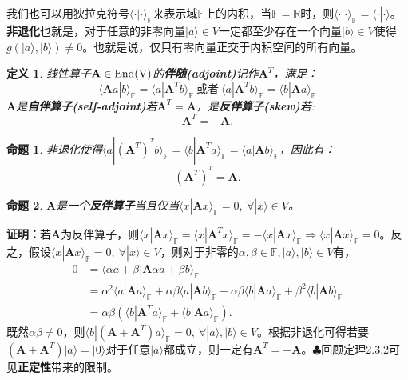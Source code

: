 \documentclass[mathserif,hyperref,UTF8,openany,b5paper]{ctexbook}
\newtheorem{defn}{定义}[section]
\newtheorem{pro}{命题}[section]
\begin{document}
我们也可以用狄拉克符号$\langle\cdot|\cdot\rangle_{\mathbb{F}}$来表示域$\mathbb{F}$上的内积，当$\mathbb{F}=\mathbb{R}$时，则$\langle\cdot|\cdot\rangle_{\mathbb{F}}=\langle\cdot|\cdot\rangle$。\textbf{非退化}也就是，对于任意的非零向量$|a\rangle\in V$一定都至少存在一个向量$|b\rangle\in V$使得$g(|a\rangle,|b\rangle)\neq 0$。也就是说，仅只有零向量正交于内积空间的所有向量。
\begin{defn}
线性算子$\mathbf{A}\in\rm End(V)$的\textbf{伴随(adjoint)}记作$\mathbf{A}^T$，满足：
\begin{equation}
    \langle\mathbf{A}a|b\rangle_\mathbb{F}=\langle a|\mathbf{A}^T b\rangle_\mathbb{F}\ \mbox{或者}\ \langle a|\mathbf{A}^T b\rangle_\mathbb{F} = \langle b|\mathbf{A} a\rangle_\mathbb{F}
\end{equation}
$\mathbf{A}$是\textbf{自伴算子(self-adjoint)}若$\mathbf{A}^T=\mathbf{A}$，是\textbf{反伴算子(skew)}若:
\begin{equation}
\boxed{\mathbf{A}^T=-\mathbf{A}}.
\end{equation}
\end{defn}
\begin{pro}
非退化使得$\langle a|(\mathbf{A}^T)^{^T} b\rangle_\mathbb{F} =\langle b|\mathbf{A}^T a\rangle_\mathbb{F} = \langle a|\mathbf{A} b\rangle_\mathbb{F}$，因此有：
\begin{equation}
\boxed{(\mathbf{A}^T)^{^T}=\mathbf{A}}.
\end{equation}
\end{pro}
\begin{pro}
$\mathbf{A}$是一个\textbf{反伴算子}当且仅当$\langle x|\mathbf{A} x\rangle_\mathbb{F}=0,\ \forall |x\rangle \in V$。
\end{pro}
\textbf{证明：}若$\mathbf{A}$为反伴算子，则$\langle x|\mathbf{A} x\rangle_\mathbb{F}=\langle x|\mathbf{A}^T x\rangle_\mathbb{F}=-\langle x|\mathbf{A} x\rangle_\mathbb{F}\Rightarrow\langle x|\mathbf{A} x\rangle_\mathbb{F}=0$。反之，假设$\langle x|\mathbf{A} x\rangle_\mathbb{F}=0,\ \forall|x\rangle\in V$，则对于非零的$\alpha,\beta\in\mathbb{F},|a\rangle,|b\rangle\in V$有，
\begin{align}
    0&=\langle \alpha a+\beta |\mathbf{A} \alpha a+\beta b\rangle_\mathbb{F}\\
    &=\alpha^2\langle a|\mathbf{A} a\rangle_\mathbb{F}+\alpha\beta\langle a|\mathbf{A} b\rangle_\mathbb{F}+\alpha\beta\langle b|\mathbf{A} a\rangle_\mathbb{F}+\beta^2\langle b|\mathbf{A} b\rangle_\mathbb{F}\\
    &=\alpha\beta(\langle b|\mathbf{A}^T a\rangle_\mathbb{F}+\langle b|\mathbf{A} a\rangle_\mathbb{F}).
\end{align}既然$\alpha\beta\neq 0$，则$\langle b|(\mathbf{A}+\mathbf{A}^T) a\rangle_\mathbb{F}=0,\ \forall |a\rangle,|b\rangle\in V$。根据非退化可得若要$(\mathbf{A}+\mathbf{A}^T) |a\rangle=|0\rangle$对于任意$|a\rangle$都成立，则一定有$\mathbf{A}^T=-\mathbf{A}$。$\clubsuit$回顾定理2.3.2可见\textbf{正定性}带来的限制。
\end{document}
